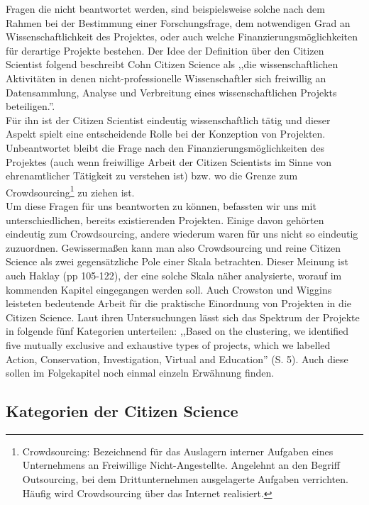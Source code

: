 \documentclass{article}
\begin{document}
Fragen die nicht beantwortet werden, sind beispielsweise solche nach dem Rahmen bei der Bestimmung einer Forschungsfrage,
dem notwendigen Grad an Wissenschaftlichkeit des Projektes, oder auch welche Finanzierungsmöglichkeiten für derartige Projekte bestehen.
Der Idee der Definition über den Citizen Scientist folgend beschreibt Cohn Citizen Science als 
,,die wissenschaftlichen Aktivitäten in denen nicht-professionelle Wissenschaftler sich freiwillig an Datensammlung, 
Analyse und Verbreitung eines wissenschaftlichen Projekts beteiligen.''\cite{Cohn}.\\
Für ihn ist der Citizen Scientist eindeutig wissenschaftlich tätig und dieser Aspekt spielt eine entscheidende Rolle 
bei der Konzeption von Projekten. Unbeantwortet bleibt die Frage nach den Finanzierungsmöglichkeiten des Projektes 
(auch wenn freiwillige Arbeit der Citizen Scientists im Sinne von ehrenamtlicher Tätigkeit zu verstehen ist) bzw. wo die
Grenze zum Crowdsourcing\footnote{Crowdsourcing: Bezeichnend für das Auslagern interner Aufgaben eines Unternehmens an Freiwillige Nicht-Angestellte. Angelehnt an den Begriff Outsourcing, bei dem Drittunternehmen ausgelagerte Aufgaben verrichten. 
Häufig wird Crowdsourcing über das Internet realisiert.} zu ziehen ist.\\
Um diese Fragen für uns beantworten zu können, befassten wir uns mit unterschiedlichen, bereits existierenden Projekten.
Einige davon gehörten eindeutig zum Crowdsourcing, andere wiederum waren für uns nicht so eindeutig zuzuordnen.
Gewissermaßen kann man also Crowdsourcing und reine Citizen Science als zwei gegensätzliche Pole einer Skala betrachten.
Dieser Meinung ist auch Haklay\cite{Haklay} (pp 105-122), der eine solche Skala näher analysierte, 
worauf im kommenden Kapitel eingegangen werden soll.
Auch Crowston und Wiggins\cite{CW} leisteten bedeutende Arbeit für die praktische Einordnung von Projekten in die Citizen Science.
Laut ihren Untersuchungen lässt sich das Spektrum der Projekte in folgende fünf Kategorien unterteilen:
,,Based on the clustering, we identified five mutually exclusive and exhaustive types of projects,
which we labelled Action, Conservation, Investigation, Virtual and Education'' (S. 5).
Auch diese sollen im Folgekapitel noch einmal einzeln Erwähnung finden.


\subsection{Kategorien der Citizen Science}
\end{document}
